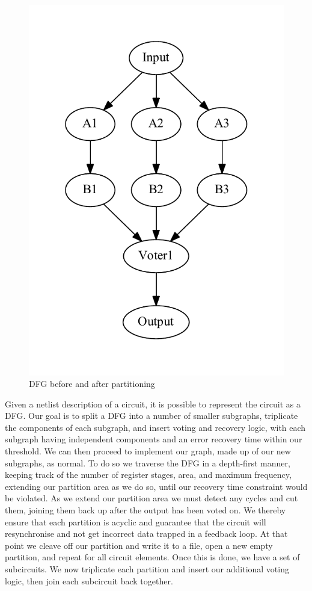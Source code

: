 \documentclass[12pt,final,oneside]{dwThesis} %
\begin{document}
\begin{figure}
\begin{center}
         \includegraphics[height=0.2\textheight]{images/TMR-post.pdf}
         \caption{\gls{DFG} before and after partitioning} \label{TMRFigure}
      \end{center} \end{figure} Given a netlist description of a circuit, it is
   possible to represent the circuit as a \gls{DFG}\cite{FPGAArch}. Our goal is
   to split a \gls{DFG} into a number of smaller subgraphs, triplicate the
   components of each subgraph, and insert voting and recovery logic, with each
   subgraph having independent components and an error recovery time within our
   threshold. We can then proceed to implement our graph, made up of our new
   subgraphs, as normal.  To do so we traverse the \gls{DFG} in a depth-first
   manner, keeping track of the number of register stages, area, and maximum
   frequency, extending our partition area as we do so, until our recovery time
   constraint would be violated.  As we extend our partition area we must
   detect any cycles and cut them, joining them back up after the output has
   been voted on. We thereby ensure that each partition is acyclic and
   guarantee that the circuit will resynchronise and not get incorrect data
   trapped in a feedback loop.  At that point we cleave off our partition and
   write it to a file, open a new empty partition, and repeat for all circuit
   elements.  Once this is done, we have a set of subcircuits. We now
   triplicate each partition and insert our additional voting logic, then join
   each subcircuit back together.
\end{document}
